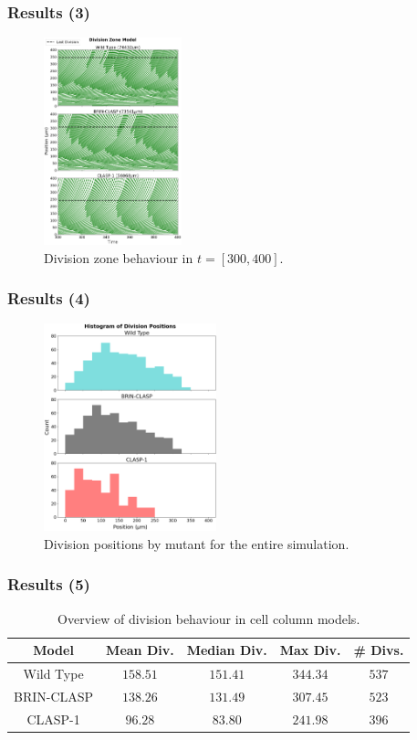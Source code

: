 \documentclass{beamer}
\begin{document}
\begin{frame}
    \frametitle{Results (3)}
    \begin{figure}
        \centering
        \includegraphics[height=6cm]{column-division-zone.png}
        \caption{Division zone behaviour in $t = [300, 400]$.}
    \end{figure}
\end{frame}

\begin{frame}
\frametitle{Results (4)}
\begin{figure}
    \centering
    \includegraphics[height=6cm]{column-division-histogram.png}
    \caption{Division positions by mutant for the entire simulation.}
\end{figure}
\end{frame}

\begin{frame}
\frametitle{Results (5)}
\begin{table}
    \begin{center}
        \begin{tabular}{ |c|c|c|c|c| } 
        \hline
        Model & Mean Div. & Median Div. & Max Div. & \# Divs.  \\
        \hline
        Wild Type & $158.51$ & $151.41$ & $344.34$ & $537$  \\
        BRIN-CLASP & $138.26$ & $131.49$ & $307.45$ & $523$  \\
        CLASP-1 & $96.28$ & $83.80$ & $241.98$ & $396$  \\
        \hline
        \end{tabular}
    \caption{Overview of division behaviour in cell column models.}
    \end{center}
\end{table}
\end{frame}
\end{document}
